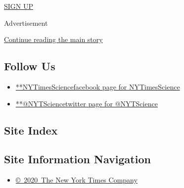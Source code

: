 \href{/newsletters/signup/SC}{SIGN UP}

Advertisement

\protect\hyperlink{after-mktg}{Continue reading the main story}

\hypertarget{follow-us}{%
\subsection{Follow Us}\label{follow-us}}

\begin{itemize}
\tightlist
\item
  \href{https://www.facebookcorewwwi.onion/NYTimesScience}{**NYTimesSciencefacebook
  page for NYTimesScience}
\item
  \href{https://twitter.com/NYTScience}{**@NYTSciencetwitter page for
  @NYTScience}
\end{itemize}

\hypertarget{site-index}{%
\subsection{Site Index}\label{site-index}}

\hypertarget{site-information-navigation}{%
\subsection{Site Information
Navigation}\label{site-information-navigation}}

\begin{itemize}
\tightlist
\item
  \href{https://help.nytimes3xbfgragh.onion/hc/en-us/articles/115014792127-Copyright-notice}{©~2020~The
  New York Times Company}
\end{itemize}

